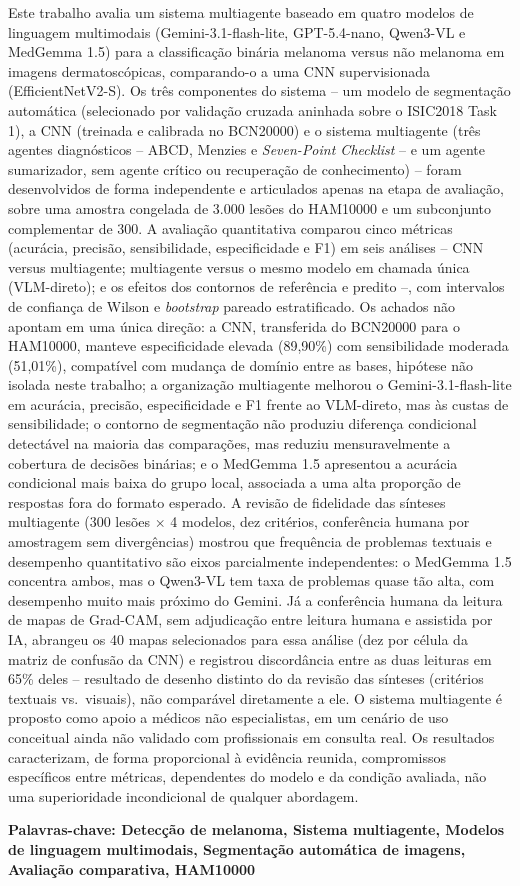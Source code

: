 \begin{resumo}
Este trabalho avalia um sistema multiagente baseado em quatro modelos de linguagem multimodais (Gemini-3.1-flash-lite, GPT-5.4-nano, Qwen3-VL e MedGemma 1.5) para a classificação binária melanoma versus não melanoma em imagens dermatoscópicas, comparando-o a uma CNN supervisionada (EfficientNetV2-S). Os três componentes do sistema -- um modelo de segmentação automática (selecionado por validação cruzada aninhada sobre o ISIC2018 Task 1), a CNN (treinada e calibrada no BCN20000) e o sistema multiagente (três agentes diagnósticos -- ABCD, Menzies e \textit{Seven-Point Checklist} -- e um agente sumarizador, sem agente crítico ou recuperação de conhecimento) -- foram desenvolvidos de forma independente e articulados apenas na etapa de avaliação, sobre uma amostra congelada de 3.000 lesões do HAM10000 e um subconjunto complementar de 300. A avaliação quantitativa comparou cinco métricas (acurácia, precisão, sensibilidade, especificidade e F1) em seis análises -- CNN versus multiagente; multiagente versus o mesmo modelo em chamada única (VLM-direto); e os efeitos dos contornos de referência e predito --, com intervalos de confiança de Wilson e \textit{bootstrap} pareado estratificado. Os achados não apontam em uma única direção: a CNN, transferida do BCN20000 para o HAM10000, manteve especificidade elevada (89,90\%) com sensibilidade moderada (51,01\%), compatível com mudança de domínio entre as bases, hipótese não isolada neste trabalho; a organização multiagente melhorou o Gemini-3.1-flash-lite em acurácia, precisão, especificidade e F1 frente ao VLM-direto, mas às custas de sensibilidade; o contorno de segmentação não produziu diferença condicional detectável na maioria das comparações, mas reduziu mensuravelmente a cobertura de decisões binárias; e o MedGemma 1.5 apresentou a acurácia condicional mais baixa do grupo local, associada a uma alta proporção de respostas fora do formato esperado. A revisão de fidelidade das sínteses multiagente (300 lesões $\times$ 4 modelos, dez critérios, conferência humana por amostragem sem divergências) mostrou que frequência de problemas textuais e desempenho quantitativo são eixos parcialmente independentes: o MedGemma 1.5 concentra ambos, mas o Qwen3-VL tem taxa de problemas quase tão alta, com desempenho muito mais próximo do Gemini. Já a conferência humana da leitura de mapas de Grad-CAM, sem adjudicação entre leitura humana e assistida por IA, abrangeu os 40 mapas selecionados para essa análise (dez por célula da matriz de confusão da CNN) e registrou discordância entre as duas leituras em 65\% deles -- resultado de desenho distinto do da revisão das sínteses (critérios textuais vs.\ visuais), não comparável diretamente a ele. O sistema multiagente é proposto como apoio a médicos não especialistas, em um cenário de uso conceitual ainda não validado com profissionais em consulta real. Os resultados caracterizam, de forma proporcional à evidência reunida, compromissos específicos entre métricas, dependentes do modelo e da condição avaliada, não uma superioridade incondicional de qualquer abordagem.

\textbf{Palavras-chave: Detecção de melanoma, Sistema multiagente, Modelos de linguagem multimodais, Segmentação automática de imagens, Avaliação comparativa, HAM10000}
\end{resumo}
